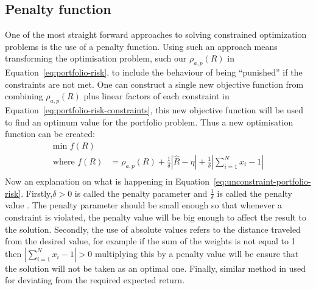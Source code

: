 \documentclass{pdfmx4020}
\begin{document}
    \subsection{Penalty function} %
    \label{sub:penalty_function}
    One of the most straight forward approaches to solving constrained optimization problems is the use of a penalty function\cite{constraint}. Using such an approach means transforming the optimisation problem, such our $\rho_{a,p}(R)$ in Equation~\ref{eq:portfolio-risk}, to include the behaviour of being ``punished'' if the constraints are not met. One can construct a single new objective function from combining $\rho_{a,p}(R)$ plus linear factors of each constraint in Equation~\ref{eq:portfolio-risk-constraints}, this new objective function will be used to find an optimum value for the portfolio problem. Thus a new optimisation function can be created:
      \begin{equation} \label{eq:unconstraint-portfolio-risk}
        \begin{split}
          \text{min } f(R) & \\
          \text{where } 
          f(R) & = \rho_{a,p}(R) + \frac{1}{\delta}|\widehat{R}-\eta| + \frac{1}{\delta}|\sum\limits_{i=1}^N x_i -1| \\
        \end{split}
      \end{equation}
    Now an explanation on what is happening in Equation~\ref{eq:unconstraint-portfolio-risk}. Firstly,$\delta > 0$ is called the penalty parameter and $\frac{1}{\delta}$ is called the penalty value \cite{constraint}. The penalty parameter should be small enough so that whenever a constraint is violated, the penalty value will be big enough to affect the result to the solution. Secondly, the use of absolute values refers to the distance traveled from the desired value, for example if the sum of the weights is not equal to 1 then $|\sum\limits_{i=1}^N x_i -1| > 0$ multiplying this by a penalty value will be ensure that the solution will not be taken as an optimal one. Finally, similar method in used for deviating from the required expected return. 
\end{document}
